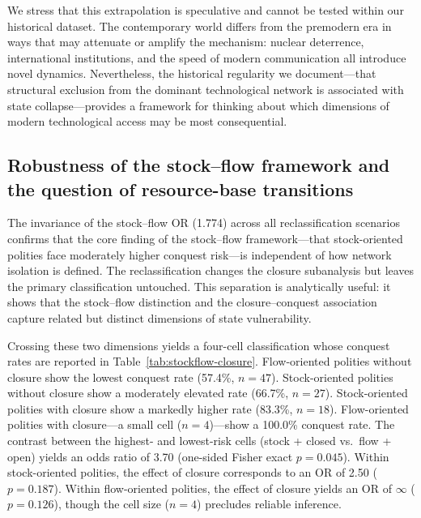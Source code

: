 \documentclass[pdflatex,sn-basic]{sn-jnl}
\theoremstyle{thmstyleone}%
\theoremstyle{thmstyletwo}%
\theoremstyle{thmstylethree}%
\begin{document}
We stress that this extrapolation is speculative and cannot be tested within our historical dataset. The contemporary world differs from the premodern era in ways that may attenuate or amplify the mechanism: nuclear deterrence, international institutions, and the speed of modern communication all introduce novel dynamics. Nevertheless, the historical regularity we document---that structural exclusion from the dominant technological network is associated with state collapse---provides a framework for thinking about which dimensions of modern technological access may be most consequential.

\subsection{Robustness of the stock--flow framework and the question of resource-base transitions}\label{sec:disc-stockflow}

The invariance of the stock--flow OR (1.774) across all reclassification scenarios confirms that the core finding of the stock--flow framework---that stock-oriented polities face moderately higher conquest risk---is independent of how network isolation is defined. The reclassification changes the closure subanalysis but leaves the primary classification untouched. This separation is analytically useful: it shows that the stock--flow distinction and the closure--conquest association capture related but distinct dimensions of state vulnerability.

Crossing these two dimensions yields a four-cell classification whose conquest rates are reported in Table~\ref{tab:stockflow-closure}. Flow-oriented polities without closure show the lowest conquest rate (57.4\%, $n = 47$). Stock-oriented polities without closure show a moderately elevated rate (66.7\%, $n = 27$). Stock-oriented polities with closure show a markedly higher rate (83.3\%, $n = 18$). Flow-oriented polities with closure---a small cell ($n = 4$)---show a 100.0\% conquest rate. The contrast between the highest- and lowest-risk cells (stock + closed vs.\ flow + open) yields an odds ratio of 3.70 (one-sided Fisher exact $p = 0.045$). Within stock-oriented polities, the effect of closure corresponds to an OR of 2.50 ($p = 0.187$). Within flow-oriented polities, the effect of closure yields an OR of $\infty$ ($p = 0.126$), though the cell size ($n = 4$) precludes reliable inference.
\end{document}
